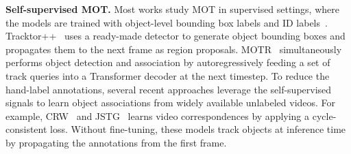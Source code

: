 % 
% 



\textbf{Self-supervised MOT.} Most works study MOT in supervised settings, where the models are trained with object-level bounding box labels and ID labels~\cite{chu2019famnet, zhang2019robust,zhou2020tracking,zeng2022motr,cai2022memot}. Tracktor++~\cite{bergmann2019tracking} uses a ready-made detector\cite{girshick2015fast} to generate object bounding boxes and propagates them to the next frame as region proposals. MOTR~\cite{zeng2022motr} simultaneously performs object detection and association by autoregressively feeding a set of track queries into a Transformer decoder at the next timestep. To reduce the hand-label annotations, several recent approaches leverage the self-supervised signals to learn object associations from widely available unlabeled videos. For example, CRW~\cite{wang2019learning} and JSTG~\cite{zhao2021modelling} learns video correspondences by applying a cycle-consistent loss. Without  fine-tuning, these models track objects at inference time by propagating the annotations from the first frame.

